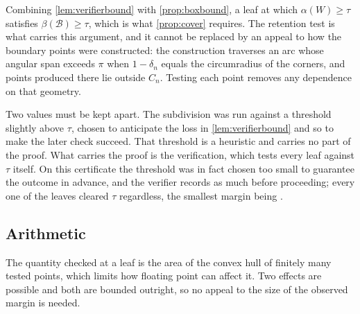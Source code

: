 \documentclass[a4paper,UKenglish,cleveref,autoref,thm-restate,numberwithinsect]{lipics-v2021}
\begin{document}
Combining \cref{lem:verifierbound} with \cref{prop:boxbound}, a leaf at which
$\alpha(W)\ge\tau$ satisfies $\beta(\mathcal{B})\ge\tau$, which is what
\cref{prop:cover} requires. The retention test is what carries this argument, and
it cannot be replaced by an appeal to how the boundary points were constructed:
the construction traverses an arc whose angular span exceeds $\pi$ when
$1-\delta_n$ equals the circumradius of the corners, and points produced there
lie outside $C_n$. Testing each point removes any dependence on that geometry.

\begin{remark}
\label{rem:thresholds}
Two values must be kept apart. The subdivision was run against a threshold
slightly above $\tau$, chosen to anticipate the loss in \cref{lem:verifierbound}
and so to make the later check succeed. That threshold is a heuristic and carries
no part of the proof. What carries the proof is the verification, which tests
every leaf against $\tau$ itself. On this certificate the threshold was in fact
chosen too small to guarantee the outcome in advance, and the verifier records as
much before proceeding; every one of the \Leaves{} leaves cleared $\tau$
regardless, the smallest margin being \WorstSlack{}.
\end{remark}

\subsection{Arithmetic}
\label{sec:errors}

The quantity checked at a leaf is the area of the convex hull of finitely many
tested points, which limits how floating point can affect it. Two effects are
possible and both are bounded outright, so no appeal to the size of the observed
margin is needed.
\end{document}
